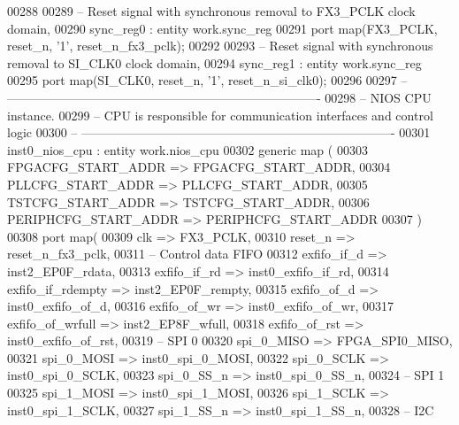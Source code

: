 \begin{DoxyCode}
00288    
00289 \textcolor{keyword}{   -- Reset signal with synchronous removal to FX3\_PCLK clock domain, }
00290    sync\_reg0 : \textcolor{keywordflow}{entity} work.sync_reg 
00291    \textcolor{keywordflow}{port} \textcolor{keywordflow}{map}(FX3_PCLK, reset_n, '1', reset_n_fx3_pclk\textcolor{vhdlchar}{)};
00292    
00293 \textcolor{keyword}{   -- Reset signal with synchronous removal to SI\_CLK0 clock domain, }
00294    sync\_reg1 : \textcolor{keywordflow}{entity} work.sync_reg 
00295    \textcolor{keywordflow}{port} \textcolor{keywordflow}{map}(SI_CLK0, reset_n, '1', reset_n_si_clk0\textcolor{vhdlchar}{)};
00296      
00297 \textcolor{keyword}{-- ----------------------------------------------------------------------------}
00298 \textcolor{keyword}{-- NIOS CPU instance.}
00299 \textcolor{keyword}{-- CPU is responsible for communication interfaces and control logic}
00300 \textcolor{keyword}{-- ----------------------------------------------------------------------------   }
00301    inst0\_nios\_cpu : \textcolor{keywordflow}{entity} work.nios_cpu
00302    \textcolor{keywordflow}{generic} \textcolor{keywordflow}{map} (
00303       FPGACFG\_START\_ADDR   => FPGACFG_START_ADDR,
00304       PLLCFG\_START\_ADDR    => PLLCFG_START_ADDR,
00305       TSTCFG\_START\_ADDR    => TSTCFG_START_ADDR,
00306       PERIPHCFG\_START\_ADDR => PERIPHCFG_START_ADDR
00307    \textcolor{vhdlchar}{)}
00308    \textcolor{keywordflow}{port} \textcolor{keywordflow}{map}(
00309       clk                        => FX3_PCLK,
00310       reset\_n                    => reset_n_fx3_pclk,
00311 \textcolor{keyword}{      -- Control data FIFO}
00312       exfifo_if_d                => inst2_EP0F_rdata,
00313       exfifo_if_rd               => inst0_exfifo_if_rd, 
00314       exfifo_if_rdempty          => inst2_EP0F_rempty,
00315       exfifo_of_d                => inst0_exfifo_of_d, 
00316       exfifo_of_wr               => inst0_exfifo_of_wr, 
00317       exfifo_of_wrfull           => inst2_EP8F_wfull,
00318       exfifo\_of\_rst              => inst0_exfifo_of_rst, 
00319 \textcolor{keyword}{      -- SPI 0 }
00320       spi\_0\_MISO                 => FPGA_SPI0_MISO,
00321       spi\_0\_MOSI                 => inst0_spi_0_MOSI,
00322       spi\_0\_SCLK                 => inst0_spi_0_SCLK,
00323       spi\_0\_SS\_n                 => inst0_spi_0_SS_n,
00324 \textcolor{keyword}{      -- SPI 1}
00325       spi_1_MOSI                 => inst0_spi_1_MOSI,
00326       spi_1_SCLK                 => inst0_spi_1_SCLK,
00327       spi_1_SS_n                 => inst0_spi_1_SS_n,
00328 \textcolor{keyword}{      -- I2C}

\end{DoxyCode}
